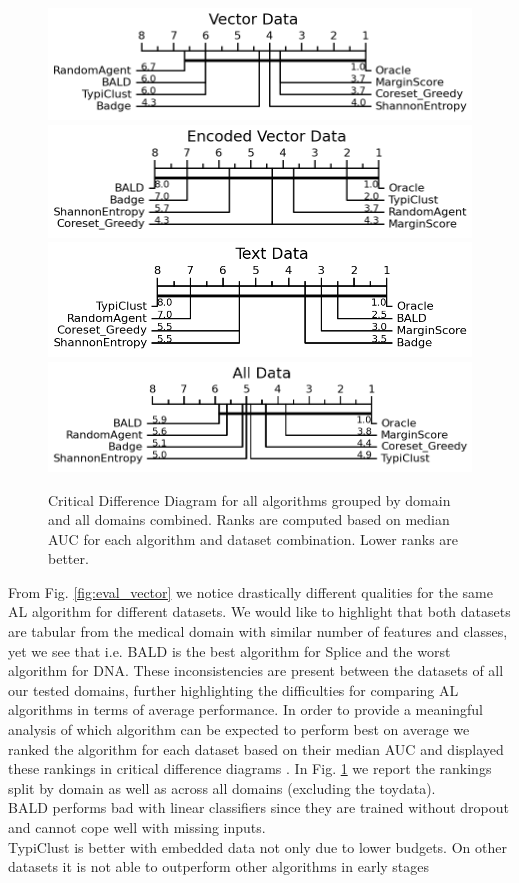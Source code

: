 \documentclass[]{article}
\begin{document}
%
\begin{figure}
\centering
	\includegraphics[width=0.49\linewidth]{img/vector.png}
	\includegraphics[width=0.49\linewidth]{img/vector_enc.png}
	\includegraphics[width=0.49\linewidth]{img/text.png}
	\includegraphics[width=0.49\linewidth]{img/all_data.png}
	\caption{Critical Difference Diagram for all algorithms grouped by domain and all domains combined. Ranks are computed based on median AUC for each algorithm and dataset combination. Lower ranks are better.}
	\label{fig:cd_diagrams}
\end{figure}
%
From Fig. \ref{fig:eval_vector} we notice drastically different qualities for the same AL algorithm for different datasets.
We would like to highlight that both datasets are tabular from the medical domain with similar number of features and classes, yet we see that i.e. BALD is the best algorithm for Splice and the worst algorithm for DNA.
These inconsistencies are present between the datasets of all our tested domains, further highlighting the difficulties for comparing AL algorithms in terms of average performance.
In order to provide a meaningful analysis of which algorithm can be expected to perform best on average we ranked the algorithm for each dataset based on their median AUC and displayed these rankings in critical difference diagrams \cite{IsmailFawaz2018deep}.
In Fig. \ref{fig:cd_diagrams} we report the rankings split by domain as well as across all domains (excluding the toydata). \\ [2mm]
%
BALD performs bad with linear classifiers since they are trained without dropout and cannot cope well with missing inputs. \\
TypiClust is better with embedded data not only due to lower budgets. On other datasets it is not able to outperform other algorithms in early stages
\end{document}
